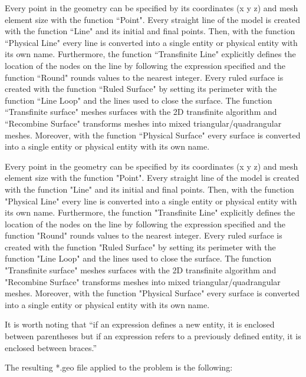 \documentclass[a4]{article}
\begin{document}
Every point in the geometry can be specified by its coordinates (x y z) and mesh element size with the function ``Point". Every straight line of the model is created with the function ``Line" and its initial and final points. Then, with the function ``Physical Line" every line is converted into a single entity or physical entity with its own name. Furthermore, the function ``Transfinite Line" explicitly defines the location of the nodes on the line by following the expression specified and the function ``Round" rounds values to the nearest integer. Every ruled surface is created with the function ``Ruled Surface" by setting its perimeter with the function ``Line Loop" and the lines used to close the surface. The function ``Transfinite surface" meshes surfaces with the 2D transfinite algorithm and ``Recombine Surface" transforms meshes into mixed triangular/quadrangular meshes. Moreover, with the function ``Physical Surface" every surface is converted into a single entity or physical entity with its own name.  

Every point in the geometry can be specified by its coordinates (x y z) and mesh element size with the function "Point". Every straight line of the model is created with the function "Line" and its initial and final points. Then, with the function "Physical Line" every line is converted into a single entity or physical entity with its own name. Furthermore, the function "Transfinite Line" explicitly defines the location of the nodes on the line by following the expression specified and the function "Round" rounds values to the nearest integer. Every ruled surface is created with the function "Ruled Surface" by setting its perimeter with the function "Line Loop" and the lines used to close the surface. The function "Transfinite surface" meshes surfaces with the 2D transfinite algorithm and "Recombine Surface" transforms meshes into mixed triangular/quadrangular meshes. Moreover, with the function "Physical Surface" every surface is converted into a single entity or physical entity with its own name.  


It is worth noting that “if an expression defines a new entity, it is enclosed between parentheses but if an expression refers to a previously defined entity, it is enclosed between braces.” \cite{gmshweb}

The resulting *.geo file applied to the problem is the following:
\end{document}
